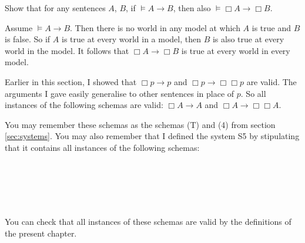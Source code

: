 \begin{exercise}
  Show that for any sentences $A$, $B$, if $\models A \to B$, then also
  $\models \Box A \to \Box B$.
\end{exercise}
\begin{solution}
  Assume $\models A \to B$. Then there is no world in any model at which $A$ is
  true and $B$ is false. So if $A$ is true at every world in a model, then $B$
  is also true at every world in the model. It follows that $\Box A \to \Box B$
  is true at every world in every model.
\end{solution}

Earlier in this section, I showed that $\Box p \to p$ and
$\Box p \to \Box\Box p$ are valid. The arguments I gave easily generalise to
other sentences in place of $p$. So all instances of the following schemas are
valid: $\Box A \to A$ and $\Box A \to \Box\Box A$.

You may remember these schemas as the schemas (T) and (4) from section
\ref{sec:systems}. You may also remember that I defined the system S5 by
stipulating that it contains all instances of the following schemas:
%
\begin{principles}
  \\
  \\
  \\
  \\
\end{principles}
%
You can check that all instances of these schemas are valid by the definitions of
the present chapter.


